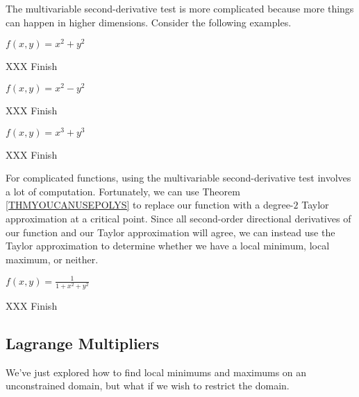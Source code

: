 The multivariable second-derivative test is more complicated because more
things can happen in higher dimensions.  Consider the following examples.

\begin{example}
	$f(x,y)=x^2+y^2$

	XXX Finish
\end{example}

\begin{example}
	$f(x,y)=x^2-y^2$

	XXX Finish
\end{example}

\begin{example}
	$f(x,y)=x^3+y^3$

	XXX Finish
\end{example}

For complicated functions, using the multivariable second-derivative test
involves a lot of computation.  Fortunately, we can use Theorem \ref{THMYOUCANUSEPOLYS}
to replace our function with a degree-$2$ Taylor approximation at a critical point.  
Since all second-order directional derivatives of our function and our Taylor approximation
will agree, we can instead use the Taylor approximation to determine whether we have a local
minimum, local maximum, or neither. 

\begin{example}
	$f(x,y)=\frac{1}{1+x^2+y^2}$

	XXX Finish
\end{example}


\subsection{Lagrange Multipliers}

We've just explored how to find local minimums and maximums on an unconstrained domain,
but what if we wish to restrict the domain.  

